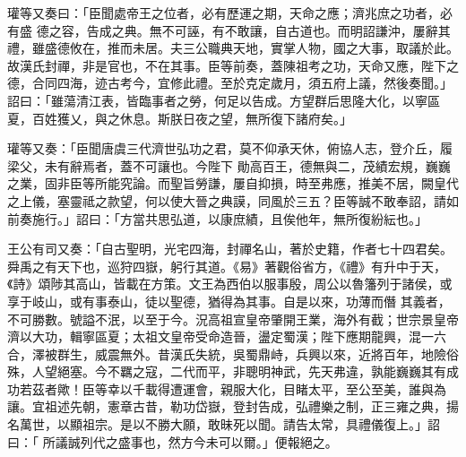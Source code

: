 \begin{pinyinscope}
 瓘等又奏曰：「臣聞處帝王之位者，必有歷運之期，天命之應；濟兆庶之功者，必有盛
 德之容，告成之典。無不可誣，有不敢讓，自古道也。而明詔謙沖，屢辭其禮，雖盛德攸在，推而未居。夫三公職典天地，實掌人物，國之大事，取議於此。故漢氏封禪，非是官也，不在其事。臣等前奏，蓋陳祖考之功，天命又應，陛下之德，合同四海，迹古考今，宜修此禮。至於克定歲月，須五府上議，然後奏聞。」詔曰：「雖蕩清江表，皆臨事者之勞，何足以告成。方望群后思隆大化，以寧區夏，百姓獲乂，與之休息。斯朕日夜之望，無所復下諸府矣。」



 瓘等又奏：「臣聞唐虞三代濟世弘功之君，莫不仰承天休，俯協人志，登介丘，履梁父，未有辭焉者，蓋不可讓也。今陛下
 勛高百王，德無與二，茂績宏規，巍巍之業，固非臣等所能究論。而聖旨勞謙，屢自抑損，時至弗應，推美不居，闕皇代之上儀，塞靈祗之款望，何以使大晉之典謨，同風於三五？臣等誠不敢奉詔，請如前奏施行。」詔曰：「方當共思弘道，以康庶績，且俟他年，無所復紛紜也。」



 王公有司又奏：「自古聖明，光宅四海，封禪名山，著於史籍，作者七十四君矣。舜禹之有天下也，巡狩四嶽，躬行其道。《易》著觀俗省方，《禮》有升中于天，《詩》頌陟其高山，皆載在方策。文王為西伯以服事殷，周公以魯籓列于諸侯，或享于岐山，或有事泰山，徒以聖德，猶得為其事。自是以來，功薄而僭
 其義者，不可勝數。號謚不泯，以至于今。況高祖宣皇帝肇開王業，海外有截；世宗景皇帝濟以大功，輯寧區夏；太祖文皇帝受命造晉，盪定蜀漢；陛下應期龍興，混一六合，澤被群生，威震無外。昔漢氏失統，吳蜀鼎峙，兵興以來，近將百年，地險俗殊，人望絕塞。今不羈之寇，二代而平，非聰明神武，先天弗違，孰能巍巍其有成功若茲者歟！臣等幸以千載得遭運會，親服大化，目睹太平，至公至美，誰與為讓。宜祖述先朝，憲章古昔，勒功岱嶽，登封告成，弘禮樂之制，正三雍之典，揚名萬世，以顯祖宗。是以不勝大願，敢昧死以聞。請告太常，具禮儀復上。」詔曰：「
 所議誠列代之盛事也，然方今未可以爾。」便報絕之。




\end{pinyinscope}
